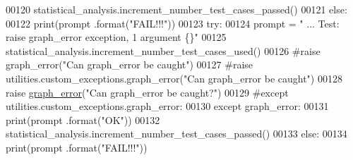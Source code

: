 \begin{DoxyCode}
00120             statistical\_analysis.increment\_number\_test\_cases\_passed()
00121         \textcolor{keywordflow}{else}:
00122             print(prompt .format(\textcolor{stringliteral}{"FAIL!!!"}))
00123         \textcolor{keywordflow}{try}:
00124             prompt = \textcolor{stringliteral}{"  ... Test: raise graph\_error exception, 1 argument   \{\}"}
00125             statistical\_analysis.increment\_number\_test\_cases\_used()
00126             \textcolor{comment}{#raise graph\_error("Can graph\_error be caught")}
00127             \textcolor{comment}{#raise utilities.custom\_exceptions.graph\_error("Can graph\_error be caught")}
00128             \textcolor{keywordflow}{raise} \hyperlink{classutilities_1_1custom__exceptions_1_1graph__error_1_1graph__error}{graph\_error}(\textcolor{stringliteral}{"Can graph\_error be caught?"})
00129         \textcolor{comment}{#except utilities.custom\_exceptions.graph\_error:}
00130         \textcolor{keywordflow}{except} graph\_error:
00131             print(prompt .format(\textcolor{stringliteral}{"OK"}))
00132             statistical\_analysis.increment\_number\_test\_cases\_passed()
00133         \textcolor{keywordflow}{else}:
00134             print(prompt .format(\textcolor{stringliteral}{"FAIL!!!"}))
\end{DoxyCode}
